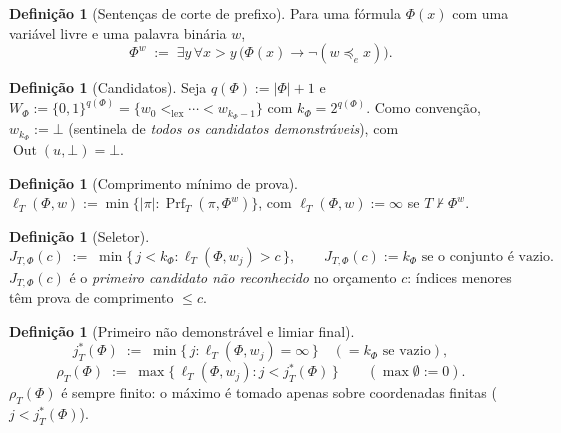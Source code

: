 \documentclass[11pt,a4paper]{article}
\theoremstyle{definition}
\newtheorem{definition}[theorem]{Definição}
\theoremstyle{remark}
\newcommand{\Prf}{\operatorname{Prf}}
\newcommand{\Out}{\operatorname{Out}}
\newcommand{\lex}{\mathrm{lex}}
\begin{document}
\begin{definition}[Senten\c{c}as de corte de prefixo]\label{def:fiw}
Para uma f\'{o}rmula $\Phi(x)$ com uma vari\'{a}vel livre e uma palavra bin\'{a}ria $w$,
\begin{equation}\label{eq:fiw}
  \Phi^{w} \;:=\; \exists y\, \forall x > y \,\bigl( \Phi(x) \rightarrow \neg (w \preceq_{e} x) \bigr).
\end{equation}
\end{definition}

\begin{definition}[Candidatos]\label{def:candidatos}
Seja $q(\Phi) := |\Phi|+1$ e $W_\Phi := \{0,1\}^{q(\Phi)} =
\{w_0 <_{\lex} \cdots < w_{k_\Phi-1}\}$ com $k_\Phi = 2^{q(\Phi)}$.
Como convenção, $w_{k_\Phi} := \bot$ (sentinela de \emph{todos os candidatos
demonstráveis}), com $\Out(u,\bot) = \bot$.
\end{definition}

\begin{definition}[Comprimento m\'{i}nimo de prova]\label{def:ell}
$\ell_T(\Phi,w) := \min\{ |\pi| : \Prf_T(\pi, \Phi^{w}) \}$, com
$\ell_T(\Phi,w) := \infty$ se $T \nvdash \Phi^{w}$.
\end{definition}

\begin{definition}[Seletor]\label{def:J}
\begin{equation}\label{eq:J}
  J_{T,\Phi}(c) \;:=\; \min\bigl\{\, j < k_\Phi : \ell_T(\Phi,w_j) > c \,\bigr\},
  \qquad J_{T,\Phi}(c) := k_\Phi \text{ se o conjunto é vazio}.
\end{equation}
$J_{T,\Phi}(c)$ é o \emph{primeiro candidato não reconhecido} no orçamento $c$:
índices menores têm prova de comprimento $\leq c$.
\end{definition}

\begin{definition}[Primeiro n\~{a}o demonstr\'{a}vel e limiar final]\label{def:jt-rho}
\begin{equation}\label{eq:jt}
  j^{*}_{T}(\Phi) \;:=\; \min\bigl\{\, j : \ell_T(\Phi,w_j) = \infty \,\bigr\}
  \quad (= k_\Phi \text{ se vazio}),
\end{equation}
\begin{equation}\label{eq:rho}
  \rho_T(\Phi) \;:=\; \max\bigl\{\, \ell_T(\Phi,w_j) : j < j^{*}_{T}(\Phi) \,\bigr\}
  \qquad (\max \emptyset := 0).
\end{equation}
$\rho_T(\Phi)$ é sempre finito: o máximo é tomado apenas sobre coordenadas
finitas ($j < j^{*}_T(\Phi)$).
\end{definition}
\end{document}
